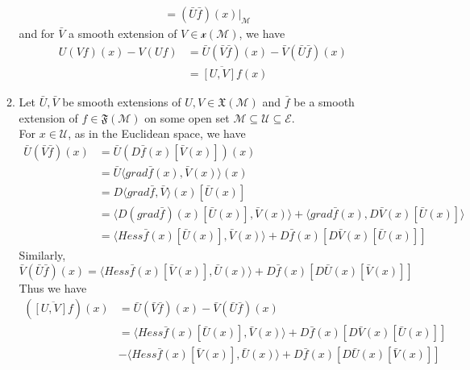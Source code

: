 \documentclass[en, oneside]{assignment}
\begin{document}
\begin{sol}
\begin{enumerate}[label=(\arabic*)]
\begin{enumerate}[label=(\alph*)]
\begin{align*}
                &= (\bar{U} \bar{f}) (x) | _\mathcal{M}
            \end{align*}
            and for $\bar{V}$ a smooth extension of $V \in \mathcal{x} (\mathcal{M})$, we have
            \begin{align*}
                U (V f) (x) - V (U f) &= \bar{U} (\bar{V} \bar{f}) (x) - \bar{V} (\bar{U} \bar{f}) (x)\\
                &= \overline{[U, V] f} (x)
            \end{align*}
            \item Let $\bar{U}, \bar{V}$ be smooth extensions of $U, V \in \mathfrak{X} (\mathcal{M})$ 
            and $\bar{f}$ be a smooth extension of $f \in \mathfrak{F} (\mathcal{M})$ on some open set $\mathcal{M} \subseteq \mathcal{U} \subseteq \mathcal{E}$.\\
            For $x \in \mathcal{U}$, as in the Euclidean space, we have
            \begin{align*}
                \bar{U} (\bar{V} \bar{f}) (x) &= \bar{U} (D \bar{f} (x) [\bar{V} (x)]) (x)\\
                &= \bar{U} \langle grad \bar{f} (x), \bar{V} (x) \rangle (x)\\
                &= D \langle grad \bar{f}, \bar{V} \rangle (x) [\bar{U} (x)]\\
                &= \langle D (grad \bar{f}) (x) [\bar{U} (x)], \bar{V} (x) \rangle + \langle grad \bar{f} (x), D \bar{V} (x) [\bar{U} (x)] \rangle\\
                &= \langle Hess \bar{f} (x) [\bar{U} (x)], \bar{V} (x) \rangle + D \bar{f} (x) [D \bar{V} (x) [\bar{U} (x)]]
            \end{align*}
            Similarly,
            \begin{equation*}
                \bar{V} (\bar{U} \bar{f}) (x) = \langle Hess \bar{f} (x) [\bar{V} (x)], \bar{U} (x) \rangle + D \bar{f} (x) [D \bar{U} (x) [\bar{V} (x)]]
            \end{equation*}
            Thus we have
            \begin{align*}
                (\overline{[U, V] f}) (x) &= \bar{U} (\bar{V} \bar{f}) (x) - \bar{V} (\bar{U} \bar{f}) (x)\\
                &= \langle Hess \bar{f} (x) [\bar{U} (x)], \bar{V} (x) \rangle + D \bar{f} (x) [D \bar{V} (x) [\bar{U} (x)]]\\
                &- \langle Hess \bar{f} (x) [\bar{V} (x)], \bar{U} (x) \rangle + D \bar{f} (x) [D \bar{U} (x) [\bar{V} (x)]]\\

\end{align*}
\end{enumerate}
\end{enumerate}
\end{sol}
\end{document}
